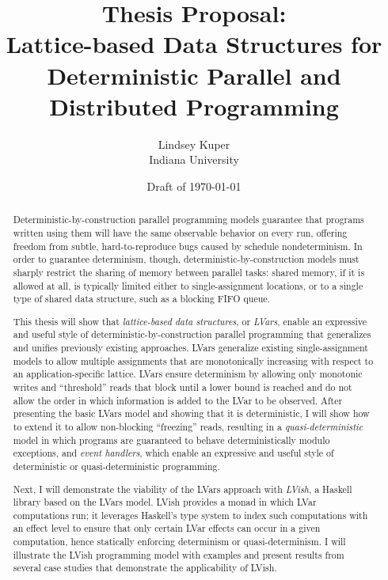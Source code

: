 \documentclass{article}
\begin{document}
\title{Thesis Proposal: \\
  Lattice-based Data Structures for 
  Deterministic Parallel and Distributed Programming}

\author{Lindsey Kuper \\ Indiana University}

\date{Draft of \today}

\maketitle

\begin{abstract}
  Deterministic-by-construction parallel programming models guarantee
  that programs written using them will have the same observable
  behavior on every run, offering freedom from subtle,
  hard-to-reproduce bugs caused by schedule nondeterminism.  In order
  to guarantee determinism, though, deterministic-by-construction
  models must sharply restrict the sharing of memory between parallel
  tasks: shared memory, if it is allowed at all, is typically limited
  either to single-assignment locations, or to a single type of shared
  data structure, such as a blocking FIFO queue.

  This thesis will show that \emph{lattice-based data structures}, or
  \emph{LVars}, enable an expressive and useful style of
  deterministic-by-construction parallel programming that generalizes
  and unifies previously existing approaches.  LVars generalize
  existing single-assignment models to allow multiple assignments that
  are monotonically increasing with respect to an application-specific
  lattice.  LVars ensure determinism by allowing only monotonic writes
  and ``threshold'' reads that block until a lower bound is reached
  and do not allow the order in which information is added to the LVar
  to be observed.  After presenting the basic LVars model and showing
  that it is deterministic, I will show how to extend it to allow
  non-blocking ``freezing'' reads, resulting in a
  \emph{quasi-deterministic} model in which programs are guaranteed to
  behave deterministically modulo exceptions, and \emph{event
    handlers}, which enable an expressive and useful style of
  deterministic or quasi-deterministic programming.

  Next, I will demonstrate the viability of the LVars approach with
  \emph{LVish}, a Haskell library based on the LVars model.  LVish
  provides a monad in which LVar computations run; it leverages
  Haskell's type system to index such computations with an effect
  level to ensure that only certain LVar effects can occur in a given
  computation, hence statically enforcing determinism or
  quasi-determinism.  I will illustrate the LVish programming model
  with examples and present results from several case studies that
  demonstrate the applicability of LVish.


\end{abstract}
\end{document}
